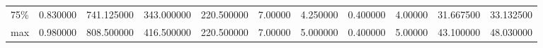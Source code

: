 \documentclass[preview]{standalone}
\begin{document}
\begin{tabular}{lrrrrrrrrrr}
75\%   &                        0.830000 &                      741.125000 &                      343.000000 &                      220.500000 &                         7.00000 &                        4.250000 &                        0.400000 &                         4.00000 &                       31.667500 &                       33.132500 \\
max   &                        0.980000 &                      808.500000 &                      416.500000 &                      220.500000 &                         7.00000 &                        5.000000 &                        0.400000 &                         5.00000 &                       43.100000 &                       48.030000 \\
\bottomrule
\end{tabular}

    
\end{document}
